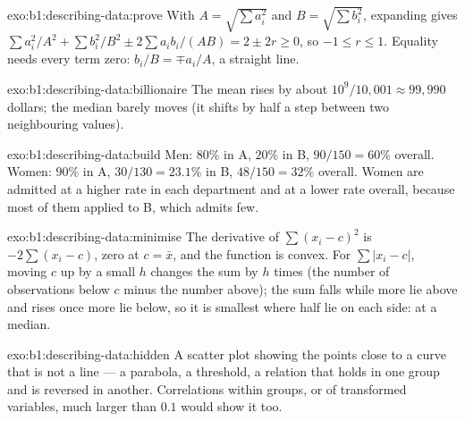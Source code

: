 \begin{solution}{exo:b1:describing-data:prove}
With $A = \sqrt{\sum a_i^2}$ and $B = \sqrt{\sum b_i^2}$, expanding gives
$\sum a_i^2/A^2 + \sum b_i^2/B^2 \pm 2\sum a_ib_i/(AB) = 2 \pm 2r \ge 0$, so $-1 \le r \le 1$. Equality needs every term zero:
$b_i/B = \mp a_i/A$, a straight line.
\end{solution}

\begin{solution}{exo:b1:describing-data:billionaire}
The mean rises by about $10^9/10{,}001 \approx 99{,}990$ dollars; the median barely moves (it
shifts by half a step between two neighbouring values).
\end{solution}

\begin{solution}{exo:b1:describing-data:build}
Men: $80\%$ in A, $20\%$ in B, $90/150 = 60\%$ overall. Women: $90\%$ in A, $30/130 = 23.1\%$ in B,
$48/150 = 32\%$ overall. Women are admitted at a higher rate in each department
and at a lower rate overall, because most of them applied to B, which
admits few.
\end{solution}

\begin{solution}{exo:b1:describing-data:minimise}
The derivative of $\sum(x_i - c)^2$ is $-2\sum(x_i - c)$, zero at $c = \bar x$, and the function is
convex. For $\sum|x_i - c|$, moving $c$ up by a small $h$ changes the sum by $h$ times
(the number of observations below $c$ minus the number above); the sum
falls while more lie above and rises once more lie below, so it is smallest
where half lie on each side: at a median.
\end{solution}

\begin{solution}{exo:b1:describing-data:hidden}
A scatter plot showing the points close to a curve that is not a line ---
a parabola, a threshold, a relation that holds in one group and is reversed
in another. Correlations within groups, or of transformed variables, much
larger than $0.1$ would show it too.
\end{solution}

